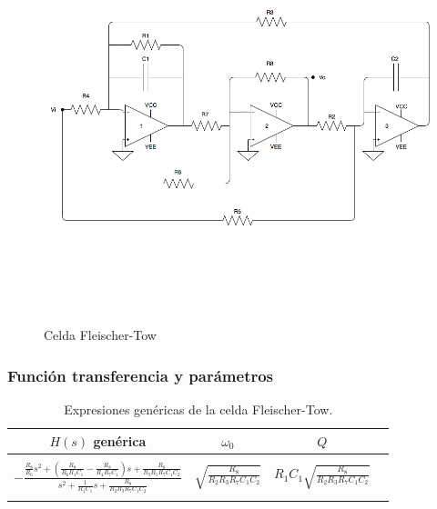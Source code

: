 \begin{figure}[H] %
	\centering
	\includegraphics[width=12cm,height=12cm,keepaspectratio]{../EJ4/imagenes/FLEISCHER.png}
	\caption{Celda Fleischer-Tow}
	\label{fleischer}
\end{figure}

\subsubsection{Funci\'on transferencia y par\'ametros}

\begin{table}[H] %
	\centering
	\begin{tabular}{c c c c}
		$H(s)$ gen\'erica & $\omega_0$ & $Q$\\
		\hline \\
		 $- \frac{\frac{R_8}{R_6}s^2+\left(\frac{R_8}{R_6R_1C_1}-\frac{R_8}{R_4R_7C_1}\right)s+\frac{R_8}{R_3R_5R_7C_1C_2}}{s^2+\frac{1}{R_1C_1}s+\frac{R_8}{R_2R_3R_7C_1C_2}}$&$\sqrt{\frac{R_8}{R_2R_3R_7C_1C_2}}$&$R_1C_1\sqrt{\frac{R_8}{R_2R_3R_7C_1C_2}}$\\ \\
		\hline
	\end{tabular}
	\caption{Expresiones gen\'ericas de la celda Fleischer-Tow.}
	\label{f_generica}
\end{table}

